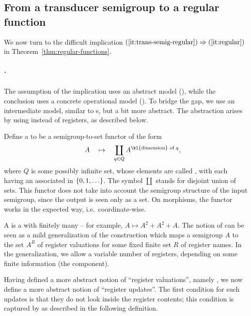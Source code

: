 \subsection{From a transducer semigroup to a regular function}
\label{sec:hard}
We now turn to the difficult implication $(\ref{it:trans-semig-regular}) \Rightarrow (\ref{it:regular})$ in Theorem~\ref{thm:regular-functions}. 

\subparagraph*{.}
\label{sec:abstract-sst} 
The assumption of the implication uses an abstract model (), while the conclusion uses a concrete operational model (). To bridge the gap, we use an intermediate model, similar to \sst{}s, but a bit more abstract. The abstraction arises by using  instead of registers, as described below. 

\AP Define a  to be a semigroup-to-set functor of the form
\begin{align*}
\qquad A \quad \mapsto \quad \coprod_{q \in Q} A^{\text{\kl{dimension} of } q},
\end{align*}
where $Q$ is some possibly infinite set, whose elements are called , with each  having an associated  in $\{0,1,\ldots\}$. The symbol $\coprod$ stands for disjoint union of sets. This functor does not take into account the semigroup structure of the input semigroup, since the output is seen only as a set.
On morphisms, the functor works in the expected way, i.e.~coordinate-wise.  

\AP A  is a  with finitely many  -- for example, $A \mapsto A^2 + A^2 + A$. 
The notion of  can be seen as a mild generalization of the construction which maps a semigroup $A$ to the set $A^R$ of register valuations for some fixed finite set $R$ of register names.  In the generalization, we allow a variable number of registers, depending on some finite information (the component). 

Having defined a more abstract notion of \enquote{register valuations}, namely , we now define a more abstract notion of \enquote{register updates}. The first condition for such updates is that they do not look inside the register contents; this condition is captured by  as described in the following definition. 



